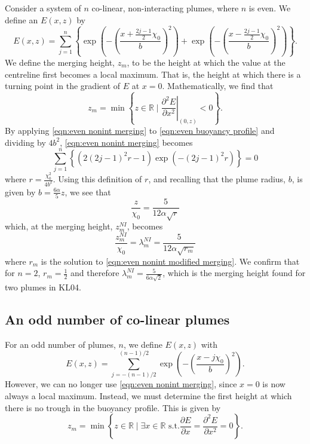\documentclass{jfm}
\newcommand{\pddx}[1]{\dfrac{\partial #1}{\partial x}} %
\newcommand{\partialSq}[2]{\dfrac{\partial^2 #1}{\partial #2^2}} %
\begin{document}
	Consider a system of $n$ co-linear, non-interacting plumes, where $n$ is even. We define an $E(x,z)$ by 
	\begin{equation}
		E(x,z) = \sum_{j=1}^n \left\{\exp\left(-\left(\frac{x+ \frac{2j-1}{2}\chi_0}{b}\right)^2\right) + \exp\left(-\left(\frac{x- \frac{2j-1}{2}\chi_0}{b}\right)^2\right)\right\}. \label{eqn:even buoyancy profile}
	\end{equation}
	We define the merging height, $z_m$, to be the height at which the value at the centreline first becomes a local maximum. That is, the height at which there is a turning point in the gradient of $E$ at $x = 0$. Mathematically, we find that
	\begin{equation}
		z_m = \min\left\{z\in\mathbb{R}\mid \left. \partialSq{E}{x}\right|_{(0,z)}< 0\right\}. \label{eqn:even nonint merging}
	\end{equation} 
	By applying \eqref{eqn:even nonint merging} to \eqref{eqn:even buoyancy profile} and dividing by $4b^2$, \eqref{eqn:even nonint merging} becomes
	\begin{equation}
		\sum_{j=1}^n \left\{(2(2j-1)^2r-1)\exp(-(2j-1)^2r)\right\} = 0 \label{eqn:even nonint modified merging}
	\end{equation}
	where $r = \tfrac{\chi_0^2}{4b^2}.$ Using this definition of $r$, and recalling that the plume radius, $b$, is given by $b = \tfrac{6\alpha}{5}z$, we see that 
	\begin{equation*}
		\frac{z}{\chi_0} = \frac{5}{12\alpha\sqrt{r}}
	\end{equation*}
	which, at the merging height, $z_m^{NI}$, becomes
	\begin{equation}
		\frac{z_m^{NI}}{\chi_0} = \lambda_m^{NI} = \frac{5}{12\alpha\sqrt{r_m}}
	\end{equation}
	where $r_m$ is the solution to \eqref{eqn:even nonint modified merging}. We confirm that for $n = 2$, $r_m = \tfrac{1}{2}$ and therefore $\lambda_m^{NI} = \tfrac{5}{6\alpha\sqrt{2}}$, which is the merging height found for two plumes in KL04.
	\subsection{An odd number of co-linear plumes}\label{subsec:odd line of NI plumes}
	For an odd number of plumes, $n$, we define $E(x,z)$ with 
	\begin{equation}
		E(x,z) = \sum_{j = -(n-1)/2}^{(n-1)/2} \exp\left(-\left(\frac{x - j\chi_0}{b}\right)^2\right). \label{eqn:odd buoyancy profile}
	\end{equation}
	However, we can no longer use \eqref{eqn:even nonint merging}, since $x = 0$ is now always a local maximum. Instead, we must determine the first height at which there is no trough in the buoyancy profile. This is given by
	\begin{equation}
	z_m = \min \left\{z\in\mathbb{R} \mid \exists x \in \mathbb{R} \text{ s.t.} \pddx{E} = \frac{\partial^2E}{\partial x^2} = 0 \right\}.\label{eqn:odd nonint merging}
	\end{equation}
	
\end{document}
